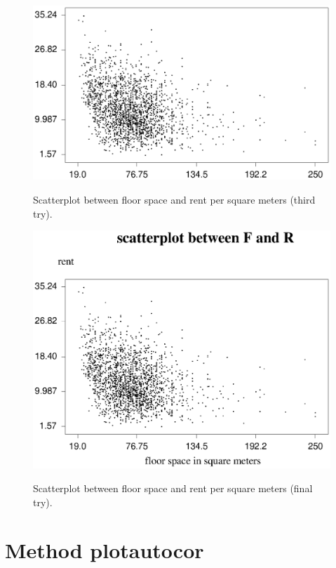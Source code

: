 \begin{figure}[ht]
\begin{center}
\includegraphics[scale=0.7]{grafiken/plotrf3.ps}
{\em\caption{ \label{plotrf3} Scatterplot between floor space and
rent per square meters (third try).}}
\end{center}
\end{figure}

\begin{figure}[ht]
\begin{center}
\includegraphics[scale=0.7]{grafiken/plotrf4.ps}
{\em\caption{ \label{plotrf4} Scatterplot between floor space and
rent per square meters (final try).}}
\end{center}
\end{figure}
\clearpage

\section{Method plotautocor}
\label{graphplotautocor} 

